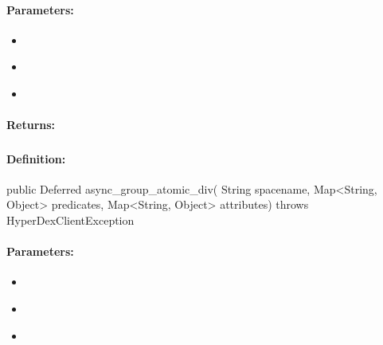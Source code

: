 \paragraph{Parameters:}
\begin{itemize}[noitemsep]
\item {}\\

\item {}\\

\item {}\\

\end{itemize}

\paragraph{Returns:}


\pagebreak
\subsubsection{}
\label{api:java:async_group_atomic_div}


\paragraph{Definition:}
\begin{javacode}
public Deferred async_group_atomic_div(
        String spacename,
        Map<String, Object> predicates,
        Map<String, Object> attributes) throws HyperDexClientException
\end{javacode}

\paragraph{Parameters:}
\begin{itemize}[noitemsep]
\item {}\\

\item {}\\

\item {}\\

\end{itemize}

